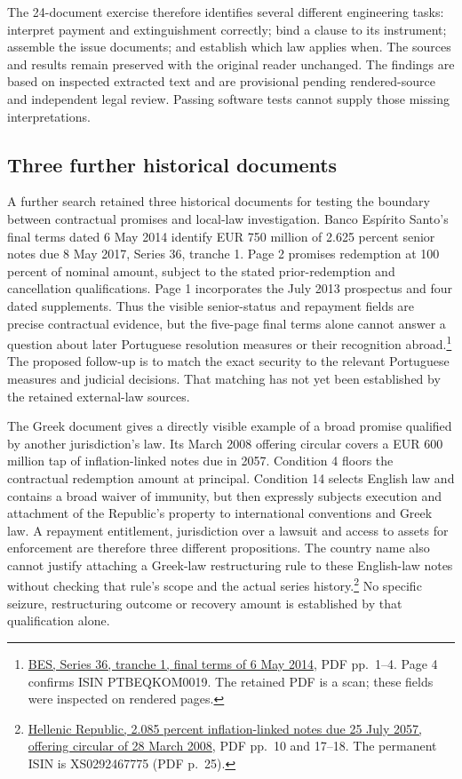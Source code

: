 The 24-document exercise therefore identifies several different engineering
tasks: interpret payment and extinguishment correctly; bind a clause to its
instrument; assemble the issue documents; and establish which law applies
when. The sources and results remain preserved with the original reader
unchanged. The findings are based on inspected extracted text and are
provisional pending rendered-source and independent legal review. Passing
software tests cannot supply those missing interpretations.


\subsection{Three further historical documents}

A further search retained three historical documents for testing the boundary
between contractual promises and local-law investigation. Banco Espírito
Santo's final terms dated 6 May 2014 identify EUR 750 million of 2.625 percent
senior notes due 8 May 2017, Series 36, tranche 1. Page 2 promises redemption
at 100 percent of nominal amount, subject to the stated prior-redemption and
cancellation qualifications. Page 1 incorporates the July 2013 prospectus and
four dated supplements. Thus the visible senior-status and repayment fields
are precise contractual evidence, but the five-page final terms alone cannot
answer a question about later Portuguese resolution measures or their
recognition abroad.\footnote{\href{../prospectus/jurisdiction-2026-10-04/sources/jur-bes-2014-ptbeqkom0019/source.pdf}
{BES, Series 36, tranche 1, final terms of 6 May 2014}, PDF pp.~1--4.
Page 4 confirms ISIN PTBEQKOM0019. The retained PDF is a scan; these
fields were inspected on rendered pages.}
The proposed follow-up is to match the exact security to the relevant
Portuguese measures and judicial decisions. That matching has not yet been
established by the retained external-law sources.

The Greek document gives a directly visible example of a broad promise
qualified by another jurisdiction's law. Its March 2008 offering circular
covers a EUR 600 million tap of inflation-linked notes due in 2057.
Condition 4 floors the contractual redemption amount at principal.
Condition 14 selects English law and contains a broad waiver of immunity,
but then expressly subjects execution and attachment of the Republic's
property to international conventions and Greek law. A repayment entitlement,
jurisdiction over a lawsuit and access to assets for enforcement are therefore
three different propositions. The country name also cannot justify attaching
a Greek-law restructuring rule to these English-law notes without checking
that rule's scope and the actual series history.\footnote{
\href{../prospectus/jurisdiction-2026-10-04/sources/jur-hellenic-2008-candidate/source.pdf}
{Hellenic Republic, 2.085 percent inflation-linked notes due 25 July 2057,
offering circular of 28 March 2008}, PDF pp.~10 and 17--18.
The permanent ISIN is XS0292467775 (PDF p.~25).}
No specific seizure, restructuring outcome or recovery amount is established
by that qualification alone.

